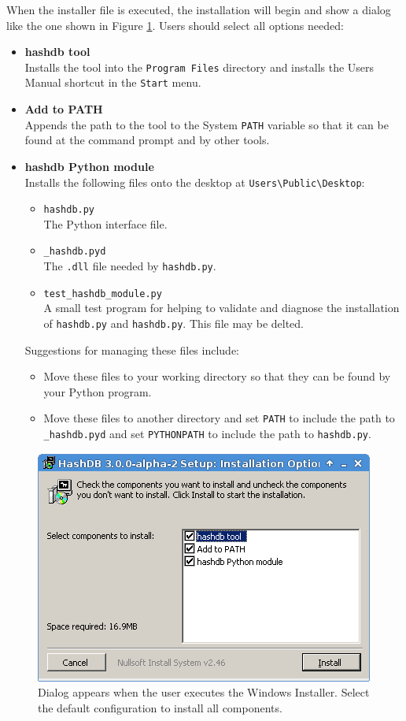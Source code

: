 \documentclass[11pt,fleqn]{article} %
\begin{document}
When the installer file is executed, the installation will begin and show a dialog like the one shown in Figure \ref{fig:windowsInstaller}.  Users should select all options needed:
\begin{itemize}
\item \textbf{hashdb tool}\\
Installs the \hdb tool into the \verb+Program Files+ directory and installs the Users Manual shortcut in the \verb+Start+ menu.
\item \textbf{Add to PATH}\\
Appends the path to the \hdb tool to the System \verb+PATH+ variable so that it can be found at the command prompt and by other tools.
\item \textbf{hashdb Python module}\\
Installs the following files onto the desktop at \verb+Users\Public\Desktop+:
  \begin{itemize}
  \item \verb+hashdb.py+\\
  The \hdb Python interface file.
  \item \verb+_hashdb.pyd+\\
  The \verb+.dll+ file needed by \verb+hashdb.py+.
  \item \verb+test_hashdb_module.py+\\
  A small test program for helping to validate and diagnose the installation of \verb+hashdb.py+ and \verb+hashdb.py+. This file may be delted.
  \end{itemize}

Suggestions for managing these files include:
  \begin{itemize}
  \item Move these files to your working directory so that they can be found by your Python program.
  \item Move these files to another directory and set \verb+PATH+ to include the path to \verb+_hashdb.pyd+ and set \verb+PYTHONPATH+ to include the path to \verb+hashdb.py+.
  \end{itemize}
\end{itemize}

\begin{figure}
	\center
	\includegraphics[scale=.8]{WindowsInstaller.png}
	\caption{Dialog appears when the user executes the Windows Installer. Select the default configuration to install all components.}
	\label{fig:windowsInstaller}
\end{figure}
\end{document}
